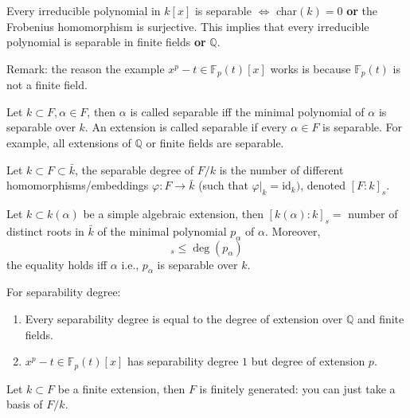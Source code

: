 \documentclass[openany]{book}
\newcommand{\F}{\mathbb{F}}
\newcommand{\Q}{\mathbb{Q}}
\begin{document}
\begin{prop}
    Every irreducible polynomial in $k[x]$ is separable $\iff$ char$(k)=0$ \textbf{or} the Frobenius homomorphism is surjective. This implies that every irreducible polynomial is separable in finite fields \textbf{ or } $\Q$.
\end{prop}

Remark: the reason the example $x^p-t\in\F_p(t)[x]$ works is because $\F_p(t)$ is not a finite field.

\begin{defn}
    Let $k\subset F, \alpha\in F$, then $\alpha$ is called separable iff the minimal polynomial of $\alpha$ is separable over $k$. An extension is called separable if every $\alpha\in F$ is separable. For example, all extensions of $\Q$ or finite fields are separable.
\end{defn}

\begin{defn}
    Let $k\subset F\subset\bar{k}$, the separable degree of $F/k$ is the number of different homomorphisms/embeddings $\varphi: F\to\bar{k}$ (such that $\varphi\vert_k=\text{id}_k)$,  denoted $[F:k]_s$.
\end{defn}

\begin{prop}
    Let $k\subset k(\alpha)$ be a simple algebraic extension, then $[k(\alpha):k]_s=$ number of distinct roots in $\bar{k}$ of the minimal polynomial $p_\alpha$ of $\alpha$. Moreover, 
    \begin{equation*}
        [k(\alpha):k]_s\leq \deg(p_\alpha)
    \end{equation*}
    the equality holds iff $\alpha$ i.e., $p_\alpha$ is separable over $k$.
\end{prop}

\begin{example}
    For separability degree: 
    \begin{enumerate}
        \item Every separability degree is equal to the degree of extension over $\Q$ and finite fields.
        \item $x^p-t\in\F_p(t)[x]$ has separability degree $1$ but degree of extension $p$.
    \end{enumerate}
\end{example}


\begin{prop}
    Let $k\subset F$ be a finite extension, then $F$ is finitely generated: you can just take a basis of $F/k$.
\end{prop}
\end{document}
